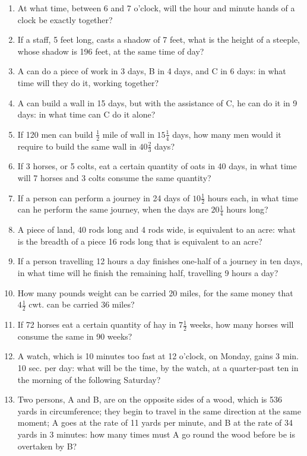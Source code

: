 \documentclass[12pt]{article}
\begin{document}
\begin{enumerate}
\item At what time, between 6 and 7 o'clock, will the hour and minute hands of a clock be exactly together? 
\spacing

\item If a staff, 5 feet long, casts a shadow of 7 feet, what is the height of a steeple, whose shadow is 196 feet, at the same time of day? 
\spacing

\item A can do a piece of work in 3 days, B in 4 days, and C in 6 days: in what time will they do it, working together? 
\spacing

\item A can build a wall in 15 days, but with the assistance of C, he can do it in 9 days: in what time can C do it alone? 
\spacing

\item If 120 men can build $\frac{1}{2}$ mile of wall in $15\frac{1}{4}$ days, how many men would it require to build the same wall in $40\frac{2}{3}$ days?  
\spacing

\item If 3 horses, or 5 colts, eat a certain quantity of oats in 40 days, in what time will 7 horses and 3 colts consume the same quantity? 
\spacing

\item If a person can perform a journey in 24 days of $10\frac{1}{2}$ hours each, in what time can he perform the same journey, when the days are $20\frac{1}{4}$ hours long? 
\spacing

\item A piece of land, 40 rods long and 4 rods wide, is equivalent to an acre: what is the breadth of a piece 16 rods long that is equivalent to an acre? 
\spacing

\item If a person travelling 12 hours a day finishes one-half of a journey in ten days, in what time will he finish the remaining half, travelling 9 hours a day?  
\spacing

\item How many pounds weight can be carried 20 miles, for the same money that $4\frac{1}{2}$ cwt. can be carried 36 miles? 
\spacing

\item If 72 horses eat a certain quantity of hay in $7\frac{1}{2}$ weeks, how many horses will consume the same in 90 weeks? 
\spacing

\item A watch, which is 10 minutes too fast at 12 o'clock, on Monday, gains 3 min. 10 sec. per day: what will be the time, by the watch, at a quarter-past ten in the morning of the following Saturday? 
\spacing

\item Two persons, A and B, are on the opposite sides of a wood, which is 536 yards in circumference; they begin to travel in the same direction at the same moment; A goes at the rate of 11 yards per minute, and B at the rate of 34 yards in 3 minutes: how many times must A go round the wood before be is overtaken by B? 
\spacing

\end{enumerate}
\end{document}
